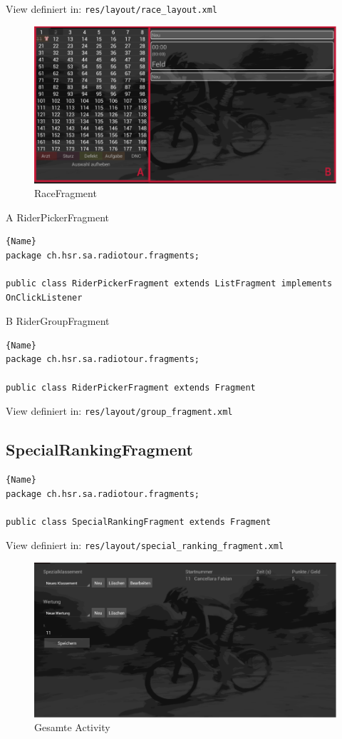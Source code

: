 View definiert in:
\lstinline|res/layout/race_layout.xml|

\begin{figure}[h!]
\caption{RaceFragment}
\centering
\includegraphics[scale=0.9]{07anhang/images/dev_racefragment.png}
\end{figure}

A RiderPickerFragment
\begin{lstlisting}{Name}
package ch.hsr.sa.radiotour.fragments;

public class RiderPickerFragment extends ListFragment implements OnClickListener
\end{lstlisting}


B RiderGroupFragment
\begin{lstlisting}{Name}
package ch.hsr.sa.radiotour.fragments;

public class RiderPickerFragment extends Fragment
\end{lstlisting}


View definiert in:
\lstinline|res/layout/group_fragment.xml|

\subsection{SpecialRankingFragment}
\begin{lstlisting}{Name}
package ch.hsr.sa.radiotour.fragments;

public class SpecialRankingFragment extends Fragment
\end{lstlisting}

View definiert in:
\lstinline|res/layout/special_ranking_fragment.xml|

\begin{figure}[h!]
\caption{Gesamte Activity}
\centering
\includegraphics[scale=0.9]{07anhang/images/dev_specialranking.png}
\end{figure}


